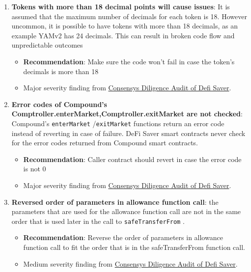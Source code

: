 \begin{enumerate}
\item\textbf{Tokens with more than 18 decimal points will cause issues}: It is assumed that the maximum number of decimals for each token is 18. However uncommon, it is possible to have tokens with more than 18 decimals, as an example YAMv2 has 24 decimals. This can result in broken code flow and unpredictable outcomes
	\begin{itemize}
	\item\textbf{Recommendation}: Make sure the code won’t fail in case the token’s decimals is more than 18
	\item Major severity finding from \href{https://consensys.net/diligence/audits/2021/03/defi-saver/\#tokens-with-more-than-18-decimal-points-will-cause-issues}{Consensys Diligence Audit of Defi Saver}.
	\end{itemize}

\item\textbf{Error codes of Compound’s Comptroller.enterMarket,\linebreak Comptroller.exitMarket are not checked}: Compound’s \verb|enterMarket| /\verb|exitMarket|  functions return an error code instead of reverting in case of failure. DeFi Saver smart contracts never check for the error codes returned from Compound smart contracts.
	\begin{itemize}
	\item\textbf{Recommendation}: Caller contract should revert in case the error code is not 0
	\item Major severity finding from \href{https://consensys.net/diligence/audits/2021/03/defi-saver/\#error-codes-of-compound-s-comptroller-entermarket-comptroller-exitmarket-are-not-checked}{Consensys Diligence Audit of Defi Saver}.
	\end{itemize}

\item\textbf{Reversed order of parameters in allowance function call}: the parameters that are used for the allowance function call are not in the same order that is used later in the call to \verb|safeTransferFrom| .
	\begin{itemize}
	\item\textbf{Recommendation}: Reverse the order of parameters in allowance function call to fit the order that is in the safeTransferFrom function call.
	\item Medium severity finding from \href{https://consensys.net/diligence/audits/2021/03/defi-saver/\#reversed-order-of-parameters-in-allowance-function-call}{Consensys Diligence Audit of Defi Saver}.
	\end{itemize}


\end{enumerate}

